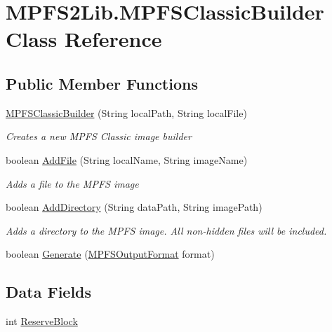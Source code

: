 \hypertarget{class_microchip_m_p_f_s_1_1_m_p_f_s2_lib_1_1_m_p_f_s_classic_builder}{}\section{M\+P\+F\+S2\+Lib.\+M\+P\+F\+S\+Classic\+Builder Class Reference}
\label{class_microchip_m_p_f_s_1_1_m_p_f_s2_lib_1_1_m_p_f_s_classic_builder}
\subsection*{Public Member Functions}
\begin{DoxyCompactItemize}
\item 
\hyperlink{class_microchip_m_p_f_s_1_1_m_p_f_s2_lib_1_1_m_p_f_s_classic_builder_a0509e1176f43c5b94e3af0cd80cf6a81}{M\+P\+F\+S\+Classic\+Builder} (String local\+Path, String local\+File)
\begin{DoxyCompactList}\small\item\em Creates a new M\+P\+F\+S Classic image builder \end{DoxyCompactList}\item 
boolean \hyperlink{class_microchip_m_p_f_s_1_1_m_p_f_s2_lib_1_1_m_p_f_s_classic_builder_afae0f69596a349b5771f1a0ad06c16e1}{Add\+File} (String local\+Name, String image\+Name)
\begin{DoxyCompactList}\small\item\em Adds a file to the M\+P\+F\+S image \end{DoxyCompactList}\item 
boolean \hyperlink{class_microchip_m_p_f_s_1_1_m_p_f_s2_lib_1_1_m_p_f_s_classic_builder_ae05e50cc4aba726ebc4318c18445da9d}{Add\+Directory} (String data\+Path, String image\+Path)
\begin{DoxyCompactList}\small\item\em Adds a directory to the M\+P\+F\+S image. All non-\/hidden files will be included. \end{DoxyCompactList}\item 
boolean \hyperlink{class_microchip_m_p_f_s_1_1_m_p_f_s2_lib_1_1_m_p_f_s_classic_builder_a6b39322ad9ef8e38f54da7ac97a4d0aa}{Generate} (\hyperlink{enum_microchip_m_p_f_s_1_1_m_p_f_s2_lib_1_1_m_p_f_s_output_format}{M\+P\+F\+S\+Output\+Format} format)
\end{DoxyCompactItemize}
\subsection*{Data Fields}
\begin{DoxyCompactItemize}
\item 
int \hyperlink{class_microchip_m_p_f_s_1_1_m_p_f_s2_lib_1_1_m_p_f_s_classic_builder_a58db3d55e60c5ebe306180035cfac9eb}{Reserve\+Block}
\end{DoxyCompactItemize}


